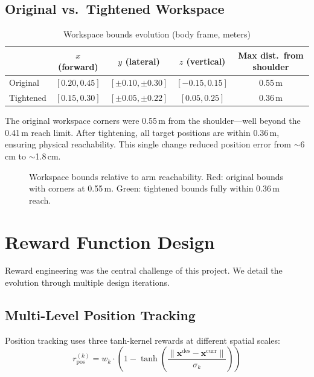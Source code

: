\documentclass[11pt,a4paper]{article}
\begin{document}
\subsection{Original vs.\ Tightened Workspace}
\begin{table}[H]
\centering
\caption{Workspace bounds evolution (body frame, meters)}
\label{tab:workspace}
\begin{tabular}{@{}lcccc@{}}
\toprule
& \textbf{$x$ (forward)} & \textbf{$y$ (lateral)} & \textbf{$z$ (vertical)} & \textbf{Max dist.\ from shoulder} \\
\midrule
Original & $[0.20, 0.45]$ & $[\pm0.10, \pm0.30]$ & $[-0.15, 0.15]$ & 0.55\,m \\
Tightened & $[0.15, 0.30]$ & $[\pm0.05, \pm0.22]$ & $[0.05, 0.25]$ & 0.36\,m \\
\bottomrule
\end{tabular}
\end{table}

\noindent The original workspace corners were 0.55\,m from the shoulder---well beyond the 0.41\,m reach limit. After tightening, all target positions are within 0.36\,m, ensuring physical reachability. This single change reduced position error from $\sim$6\,cm to $\sim$1.8\,cm.

\begin{figure}[H]
\centering
\caption{Workspace bounds relative to arm reachability. Red: original bounds with corners at 0.55\,m. Green: tightened bounds fully within 0.36\,m reach.}
\label{fig:workspace}
\end{figure}

\section{Reward Function Design}
\label{sec:rewards}

Reward engineering was the central challenge of this project. We detail the evolution through multiple design iterations.

\subsection{Multi-Level Position Tracking}
Position tracking uses three tanh-kernel rewards at different spatial scales:
\begin{equation}
  r_{\text{pos}}^{(k)} = w_k \cdot \left(1 - \tanh\left(\frac{\|\mathbf{x}^{\text{des}} - \mathbf{x}^{\text{curr}}\|}{\sigma_k}\right)\right)
  \label{eq:pos_tracking}
\end{equation}
\end{document}
